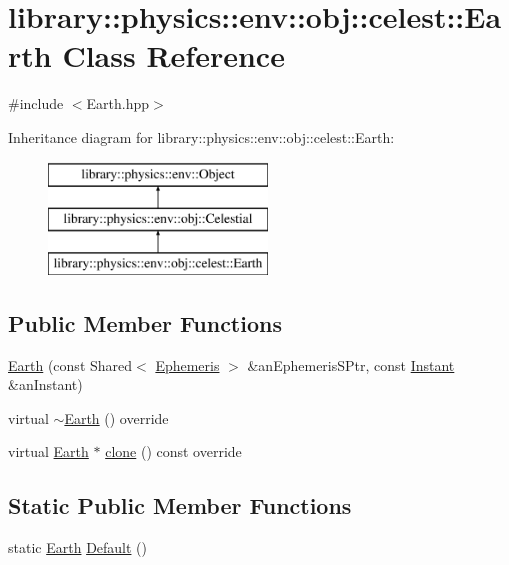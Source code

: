 \hypertarget{classlibrary_1_1physics_1_1env_1_1obj_1_1celest_1_1_earth}{}\section{library\+:\+:physics\+:\+:env\+:\+:obj\+:\+:celest\+:\+:Earth Class Reference}
\label{classlibrary_1_1physics_1_1env_1_1obj_1_1celest_1_1_earth}


{\ttfamily \#include $<$Earth.\+hpp$>$}

Inheritance diagram for library\+:\+:physics\+:\+:env\+:\+:obj\+:\+:celest\+:\+:Earth\+:\begin{figure}[H]
\begin{center}
\leavevmode
\includegraphics[height=3.000000cm]{classlibrary_1_1physics_1_1env_1_1obj_1_1celest_1_1_earth}
\end{center}
\end{figure}
\subsection*{Public Member Functions}
\begin{DoxyCompactItemize}
\item 
\hyperlink{classlibrary_1_1physics_1_1env_1_1obj_1_1celest_1_1_earth_a775057b64077c61329a426260327022c}{Earth} (const Shared$<$ \hyperlink{classlibrary_1_1physics_1_1env_1_1_ephemeris}{Ephemeris} $>$ \&an\+Ephemeris\+S\+Ptr, const \hyperlink{classlibrary_1_1physics_1_1time_1_1_instant}{Instant} \&an\+Instant)
\item 
virtual \hyperlink{classlibrary_1_1physics_1_1env_1_1obj_1_1celest_1_1_earth_a93fbd2015a7c7d786654919197c63963}{$\sim$\+Earth} () override
\item 
virtual \hyperlink{classlibrary_1_1physics_1_1env_1_1obj_1_1celest_1_1_earth}{Earth} $\ast$ \hyperlink{classlibrary_1_1physics_1_1env_1_1obj_1_1celest_1_1_earth_aca39bec00a2046a3fcef9bf22be52428}{clone} () const override
\end{DoxyCompactItemize}
\subsection*{Static Public Member Functions}
\begin{DoxyCompactItemize}
\item 
static \hyperlink{classlibrary_1_1physics_1_1env_1_1obj_1_1celest_1_1_earth}{Earth} \hyperlink{classlibrary_1_1physics_1_1env_1_1obj_1_1celest_1_1_earth_a01853b8ce201525ee6cec2f00e1580d4}{Default} ()
\end{DoxyCompactItemize}

